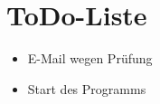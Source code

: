 \section*{ToDo-Liste}
\begin{itemize}
\item E-Mail wegen Prüfung
\item Start des Programms
\end{itemize}